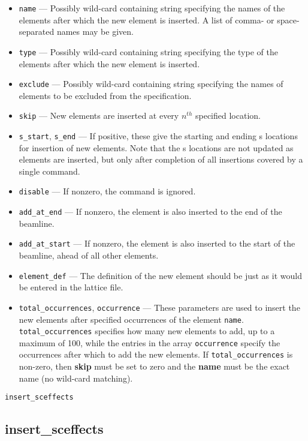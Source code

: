 \documentclass[11pt]{article}
\begin{document}
\begin{itemize}
\item \verb|name| --- Possibly wild-card containing string specifying the
   names of the elements after which the new element is inserted. A list of comma- or space-separated names may be given.
\item \verb|type| --- Possibly wild-card containing string specifying the
   type of the elements after which the new element is inserted.
\item \verb|exclude| --- Possibly wild-card containing string specifying 
   the names of elements to be excluded from the specification.
\item \verb|skip| --- New elements are inserted at every $n^{th}$ specified location.
\item \verb|s_start|, \verb|s_end| --- If positive, these give the starting and ending s locations for insertion of new elements.
  Note that the s locations are not updated as elements are inserted, but only after completion of all insertions covered by
  a single command.
\item \verb|disable| --- If nonzero, the command is ignored.
\item \verb|add_at_end| --- If nonzero, the element is also inserted to the end of the beamline.
\item \verb|add_at_start| --- If nonzero, the element is also inserted to the start of the beamline, ahead of all other elements.
\item \verb|element_def| --- The definition of the new element should be just as it would be entered in 
the lattice file.
\item \verb|total_occurrences|, \verb|occurrence| --- 
These parameters are used to insert the new elements after specified occurrences of 
the element \verb|name|.  \verb|total_occurrences| specifies how many new elements to add,
up to a maximum of 100, while the entries in the array \verb|occurrence| specify the occurrences
after which to add the new elements. If \verb|total_occurrences| is non-zero, then {\bf skip} must
be set to zero  and the {\bf name} must be the exact name (no wild-card matching). 
\end{itemize}

\newpage
\begin{center}{\Large\verb|insert_sceffects|}\end{center}
\subsection{insert\_sceffects \label{subsec:insertsceffects}}
\end{document}
